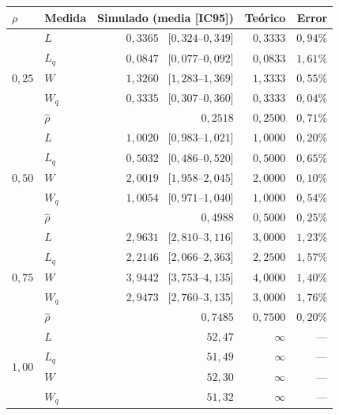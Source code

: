 \documentclass[11pt]{article}
\begin{document}
\begin{table}[H]
\centering
\small
\begin{tabular}{llrrr}
\toprule
\textbf{$\rho$} & \textbf{Medida} & \textbf{Simulado (media [IC95])}
& \textbf{Te\'orico} & \textbf{Error} \\
\midrule
\multirow{5}{*}{$0{,}25$}
 & $L$           & $0{,}3365$ \, [$0{,}324$--$0{,}349$] & $0{,}3333$ & $0{,}94\%$ \\
 & $L_q$         & $0{,}0847$ \, [$0{,}077$--$0{,}092$] & $0{,}0833$ & $1{,}61\%$ \\
 & $W$           & $1{,}3260$ \, [$1{,}283$--$1{,}369$] & $1{,}3333$ & $0{,}55\%$ \\
 & $W_q$         & $0{,}3335$ \, [$0{,}307$--$0{,}360$] & $0{,}3333$ & $0{,}04\%$ \\
 & $\hat{\rho}$  & $0{,}2518$                           & $0{,}2500$ & $0{,}71\%$ \\
\midrule
\multirow{5}{*}{$0{,}50$}
 & $L$           & $1{,}0020$ \, [$0{,}983$--$1{,}021$] & $1{,}0000$ & $0{,}20\%$ \\
 & $L_q$         & $0{,}5032$ \, [$0{,}486$--$0{,}520$] & $0{,}5000$ & $0{,}65\%$ \\
 & $W$           & $2{,}0019$ \, [$1{,}958$--$2{,}045$] & $2{,}0000$ & $0{,}10\%$ \\
 & $W_q$         & $1{,}0054$ \, [$0{,}971$--$1{,}040$] & $1{,}0000$ & $0{,}54\%$ \\
 & $\hat{\rho}$  & $0{,}4988$                           & $0{,}5000$ & $0{,}25\%$ \\
\midrule
\multirow{5}{*}{$0{,}75$}
 & $L$           & $2{,}9631$ \, [$2{,}810$--$3{,}116$] & $3{,}0000$ & $1{,}23\%$ \\
 & $L_q$         & $2{,}2146$ \, [$2{,}066$--$2{,}363$] & $2{,}2500$ & $1{,}57\%$ \\
 & $W$           & $3{,}9442$ \, [$3{,}753$--$4{,}135$] & $4{,}0000$ & $1{,}40\%$ \\
 & $W_q$         & $2{,}9473$ \, [$2{,}760$--$3{,}135$] & $3{,}0000$ & $1{,}76\%$ \\
 & $\hat{\rho}$  & $0{,}7485$                           & $0{,}7500$ & $0{,}20\%$ \\
\midrule
\multirow{5}{*}{$1{,}00$}
 & $L$           & $52{,}47$  & $\infty$ & --- \\
 & $L_q$         & $51{,}49$  & $\infty$ & --- \\
 & $W$           & $52{,}30$  & $\infty$ & --- \\
 & $W_q$         & $51{,}32$  & $\infty$ & --- \\

\end{tabular}
\end{table}
\end{document}
